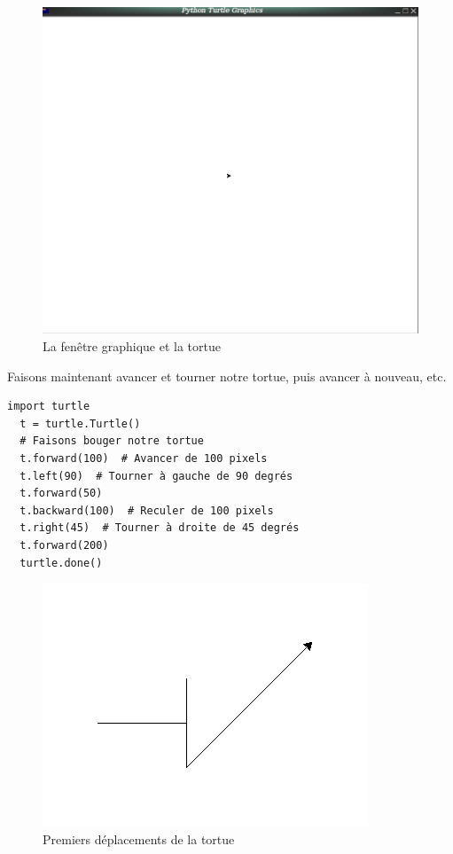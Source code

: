 \documentclass[a4paper,11pt]{book}
\begin{document}
\begin{figure}[h]
\begin{center}
\includegraphics[scale=0.15]{IMG/turtle-01.png}
\caption{La fenêtre graphique et la tortue}
\end{center}
\end{figure}
\medskip

Faisons maintenant avancer et tourner notre tortue, puis avancer à nouveau, etc.
\begin{lstlisting}[caption=La tortue se déplace]
  import turtle
  t = turtle.Turtle()
  # Faisons bouger notre tortue
  t.forward(100)  # Avancer de 100 pixels
  t.left(90)  # Tourner à gauche de 90 degrés
  t.forward(50)
  t.backward(100)  # Reculer de 100 pixels
  t.right(45)  # Tourner à droite de 45 degrés
  t.forward(200)
  turtle.done()
\end{lstlisting}
\medskip

\begin{figure}[h]
\begin{center}
\includegraphics[scale=0.4]{IMG/turtle-02.png}
\caption{Premiers déplacements de la tortue}
\end{center}
\end{figure}
\medskip
\end{document}
